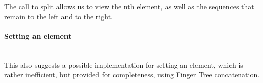 \documentclass[12pt,twoside,notitlepage]{report}
\begin{document}
The call to split allows us to view the nth element, as well as the sequences that remain to the left and to the right.

\paragraph{Setting an element} \mbox{} \\
This also suggests a possible implementation for setting an element, which is rather inefficient, but provided for completeness, using Finger Tree concatenation.

\begin{code} 
\\
\>[0]\<[4]%
\>[4] \AgdaSymbol{:}  \AgdaSymbol{\{}\AgdaSymbol{\}\{} \AgdaSymbol{:}  \AgdaSymbol{\}\{} \AgdaSymbol{:} \AgdaSymbol{\}}            \<%
\\
\>[0]\<[4]%
\>[4]            \AgdaSymbol{)}  \<%
\\
\>[0]\<[4]%
\>[4]    \AgdaSymbol{|}  \AgdaSymbol{(}   \AgdaSymbol{)}\<%
\\
\>[4]\<[6]%
\>[6]  \AgdaSymbol{(} \AgdaSymbol{)}\<%
\\
\>[6]\<[22]%
\>[22]\AgdaSymbol{(} \AgdaSymbol{)}\<%
\\
\>[6]\<[22]%
\>[22]\AgdaSymbol{(} \AgdaSymbol{)}\<%
\\
\>[0]\<[6]%
\>[6]\AgdaSymbol{=}  \AgdaSymbol{((} \AgdaSymbol{)}  \AgdaSymbol{)} \<%
\\
\>[0]\<[4]%
\>[4]    \AgdaSymbol{|}  \AgdaSymbol{=} \<%
\\
\end{code}
\end{document}
